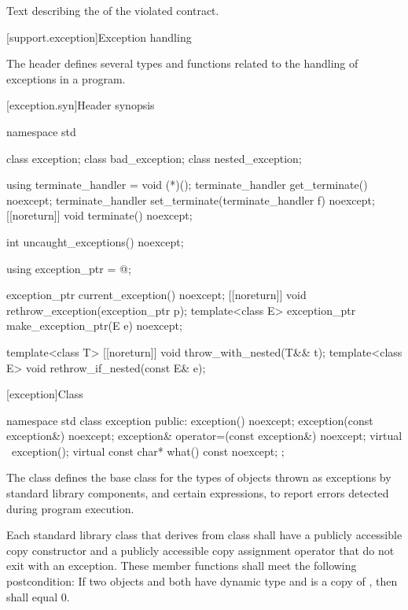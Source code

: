 \begin{itemdescr}
\pnum
\returns Text describing the 
of the violated contract.
\end{itemdescr}

[support.exception]{Exception handling}

\pnum
The header
defines several types and functions related to the handling of exceptions in a \Cpp{} program.

[exception.syn]{Header  synopsis}
%

\begin{codeblock}
namespace std {
  class exception;
  class bad_exception;
  class nested_exception;

  using terminate_handler = void (*)();
  terminate_handler get_terminate() noexcept;
  terminate_handler set_terminate(terminate_handler f) noexcept;
  [[noreturn]] void terminate() noexcept;

  int uncaught_exceptions() noexcept;

  using exception_ptr = @\unspec@;

  exception_ptr current_exception() noexcept;
  [[noreturn]] void rethrow_exception(exception_ptr p);
  template<class E> exception_ptr make_exception_ptr(E e) noexcept;

  template<class T> [[noreturn]] void throw_with_nested(T&& t);
  template<class E> void rethrow_if_nested(const E& e);
}
\end{codeblock}

[exception]{Class }

%
\begin{codeblock}
namespace std {
  class exception {
  public:
    exception() noexcept;
    exception(const exception&) noexcept;
    exception& operator=(const exception&) noexcept;
    virtual ~exception();
    virtual const char* what() const noexcept;
  };
}
\end{codeblock}

\pnum
The class
defines the base
class for the types of objects thrown as exceptions by
\Cpp{} standard library components, and certain
expressions, to report errors detected during program execution.

\pnum
Each standard library class  that derives from class  shall have a
publicly accessible copy constructor and a publicly accessible copy assignment
operator that do not exit with an exception. These member functions shall meet
the following postcondition: If two objects  and  both have
dynamic type  and  is a copy of , then
 shall equal 0.

